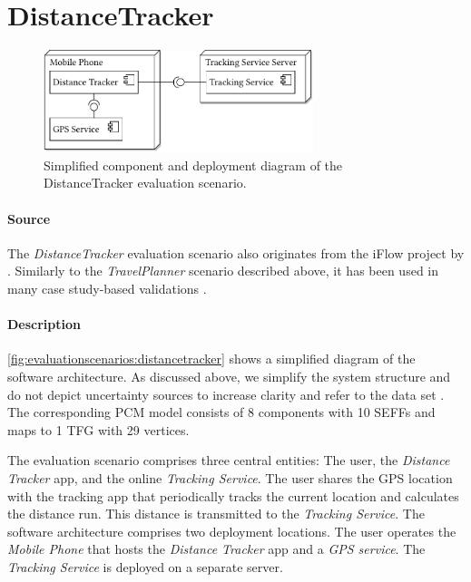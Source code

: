 \section{DistanceTracker}%
\label{sec:evaluationscenarios:distancetracker}

\begin{figure}
    \centering
    \includegraphics[width=0.7\textwidth]{figures/chapter8/scenario2_distancetracker.pdf}
    \caption{Simplified component and deployment diagram of the DistanceTracker evaluation scenario.}
    \label{fig:evaluationscenarios:distancetracker}
\end{figure}

\paragraph{Source}
The \emph{DistanceTracker} evaluation scenario also originates from the iFlow project by \textcite{katkalov_modellgetriebener_2017}.
Similarly to the \emph{TravelPlanner} scenario described above, it has been used in many case study-based validations \cite{seifermann_architectural_2022,seifermann_detecting_2022,seifermann_data-driven_2019,hahner_model-based_2023,hahner_modeling_2021,walter_architectural_2022,boltz_handling_2022}.

\paragraph{Description}
\autoref{fig:evaluationscenarios:distancetracker} shows a simplified diagram of the software architecture.
As discussed above, we simplify the system structure and do not depict uncertainty sources to increase clarity and refer to the data set \cite{dataset}.
The corresponding \ac{PCM} model consists of 8 components with 10 \acp{SEFF} and maps to 1 \ac{TFG} with 29 vertices.

The evaluation scenario comprises three central entities: The user, the \emph{Distance Tracker} app, and the online \emph{Tracking Service}.
The user shares the GPS location with the tracking app that periodically tracks the current location and calculates the distance run.
This distance is transmitted to the \emph{Tracking Service}.
The software architecture comprises two deployment locations.
The user operates the \emph{Mobile Phone} that hosts the \emph{Distance Tracker} app and a \emph{GPS service}.
The \emph{Tracking Service} is deployed on a separate server.

